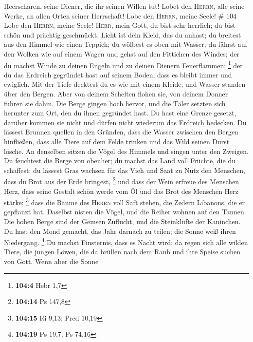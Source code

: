 Heerscharen, seine Diener, die ihr seinen Willen tut! 
Lobet den \textsc{Herrn}, alle seine Werke, an allen Orten seiner
Herrschaft! Lobe den \textsc{Herrn}, meine Seele! \# 104 
Lobe den \textsc{Herrn}, meine Seele! \textsc{Herr}, mein Gott, du bist
sehr herrlich; du bist schön und prächtig geschmückt. 
Licht ist dein Kleid, das du anhast; du breitest aus den Himmel wie
einen Teppich;  du wölbest es oben mit Wasser; du fährst
auf den Wolken wie auf einem Wagen und gehst auf den Fittichen des
Windes;  der du machst Winde zu deinen Engeln und zu
deinen Dienern Feuerflammen; \footnote{\textbf{104:4} Hebr 1,7}
 der du das Erdreich gegründet hast auf seinem Boden, dass
es bleibt immer und ewiglich.  Mit der Tiefe decktest du
es wie mit einem Kleide, und Wasser standen über den Bergen.
 Aber von deinem Schelten flohen sie, von deinem Donner
fuhren sie dahin.  Die Berge gingen hoch hervor, und die
Täler setzten sich herunter zum Ort, den du ihnen gegründet hast.
 Du hast eine Grenze gesetzt, darüber kommen sie nicht und
dürfen nicht wiederum das Erdreich bedecken.  Du lässest
Brunnen quellen in den Gründen, dass die Wasser zwischen den Bergen
hinfließen,  dass alle Tiere auf dem Felde trinken und
das Wild seinen Durst lösche.  An denselben sitzen die
Vögel des Himmels und singen unter den Zweigen.  Du
feuchtest die Berge von obenher; du machst das Land voll Früchte, die du
schaffest;  du lässest Gras wachsen für das Vieh und Saat
zu Nutz den Menschen, dass du Brot aus der Erde bringest, \footnote{\textbf{104:14}
  Ps 147,8}  und dass der Wein erfreue des Menschen Herz,
dass seine Gestalt schön werde vom Öl und das Brot des Menschen Herz
stärke; \footnote{\textbf{104:15} Ri 9,13; Pred 10,19} 
dass die Bäume des \textsc{Herrn} voll Saft stehen, die Zedern Libanons,
die er gepflanzt hat.  Daselbst nisten die Vögel, und die
Reiher wohnen auf den Tannen.  Die hohen Berge sind der
Gemsen Zuflucht, und die Steinklüfte der Kaninchen.  Du
hast den Mond gemacht, das Jahr darnach zu teilen; die Sonne weiß ihren
Niedergang. \footnote{\textbf{104:19} Ps 19,7; Ps 74,16} 
Du machst Finsternis, dass es Nacht wird; da regen sich alle wilden
Tiere,  die jungen Löwen, die da brüllen nach dem Raub
und ihre Speise suchen von Gott.  Wenn aber die Sonne
